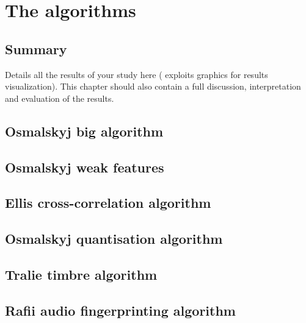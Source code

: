 
\chapter{The algorithms}
\label{chap:algorithms}
\ifpdf
    \graphicspath{{Chapter4/Figures/PNG/}{Chapter3/Figures/PDF/}{Chapter4/Figures/}}
\else
    \graphicspath{{Chapter4/Figures/EPS/}{Chapter3/Figures/}}
\fi


\section*{Summary}
Details all the results of your study here ( exploits graphics for results visualization). 
This chapter should also contain a full discussion, interpretation and evaluation of the results. 



\section{Osmalskyj big algorithm} 
\label{sec:osmalskyj}
\section{Osmalskyj weak features} 
\label{sec:weakfeatures}
\section{Ellis cross-correlation algorithm} 
\label{sec:ccs}
\section{Osmalskyj quantisation algorithm} 
\label{sec:quantisation}
\section{Tralie timbre algorithm} 
\label{sec:timbre}
\section{Rafii audio fingerprinting algorithm} 
\label{sec:rafii}


